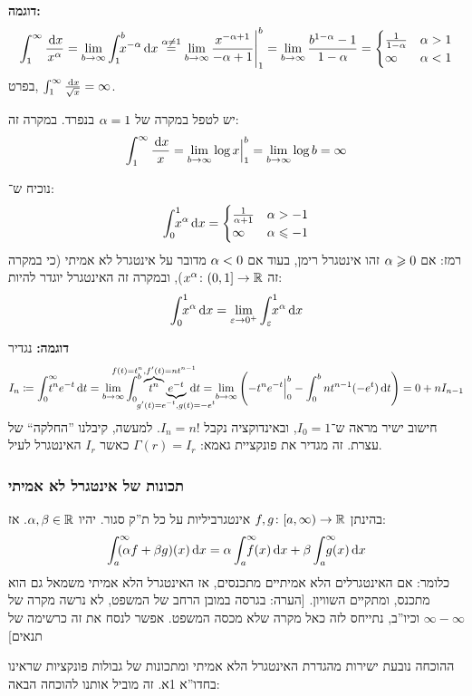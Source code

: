 \documentclass[name=רשימות חדו''א 2א]{../../../tex/classes/noChapterMegasumPreamble}
\newcommand\Is{\dequad \ }
\begin{document}
	\textbf{דוגמה: }
	\[ \int^{\infty}_1 \frac{\dx}{x^{\ag}} = \lim_{b \to \infty} \int^{b}_1 \Is x^{-\ag}\dx \overset{\ag \neq 1}{=} \lim_{b \to \infty} \frac{x^{-\ag + 1}}{-\ag + 1}\Bigg\vert^{b}_1 = \lim_{b \to \infty}\frac{b^{1 - \ag} - 1}{1 - \ag} = \begin{cases}
		\frac{1}{1 - \ag} & \ag > 1 \\
		\infty & \ag < 1
	\end{cases} \]
	בפרט, $\int^{\infty}_1 \frac{\,\mathrm{d}x}{\sqrt x} = \infty$.

	יש לטפל במקרה של $\alpha = 1$ בנפרד. במקרה זה:
	\[ \int^{\infty}_1 \frac{\,\mathrm{d}x}{x} = \lim_{b \to \infty} \log x \Big\vert^{b}_1 = \lim_{b \to \infty} \log b = \infty \]

	\exe{חשבו את האינטגרל:
	\[ \int^{1}_0 \Is x^{\ag} \]}
	נוכיח ש־:
	\[ \int^{1}_0\Is x^{\ag}\dx = \begin{cases}
		\frac{1}{\ag  +1} & \ag > -1 \\
		\infty & \ag \le -1
	\end{cases} \]
	רמז: אם $\alpha \geqslant 0$ זהו אינטגרל רימן, בעוד אם $\alpha < 0$ מדובר על אינטגרל לא אמיתי (כי במקרה זה $x^{\alpha} \colon (0, 1] \to \mathbb{R}$), ובמקרה זה האינטגרל יוגדר להיות:
	\[ \int^{1}_0 \Is x^{\ag}\dx = \lim_{\eg \to 0^{+}} \int^{1}_{\eg} \Is x^{\ag} \dx \]

	\textbf{דוגמה: }נגדיר
	\[ I_n \cod \int^{\infty}_0 \dequad t^{n}e^{-t}\dt = \lim_{b \to \infty} \int^{b}_0  \overbrace{t^{n}}^{\mathclap{f(t) = t^{n}, f'(t) = nt^{n -1}}}\underbrace{e^{-t}}_{\mathclap{g'(t) = e^{-t}, g(t) = -e^{t}}}\dt = \lim_{b \to \infty} \cl{-t^{n}e^{-t}\Big\vert^{b}_0 - \int^{b}_0 nt^{n - 1}(-e^{t})\dt} = 0 + nI_{n - 1} \]
	חישוב ישיר מראה ש־$I_0 = 1$, ובאינדוקציה נקבל $I_n = n!$. למעשה, קיבלנו ''החלקה`` של עצרת. זה מגדיר את פונקציית גאמא: $\Gamma(r) = I_r$ כאשר $I_r$ האינטגרל לעיל.

\subsubsection{תכונות של אינטגרל לא אמיתי}
	\begin{Claim}
		בהינתן $f, g \colon [a, \infty) \to \mathbb{R}$ אינטגרביליות על כל ת''ק סגור. יהיו $\alpha, \beta \in \mathbb{R}$. אז:
		\[ \int^{\infty}_a \dequad (\ag f + \bg g)(x)\dx = \ag\int^{\infty}_a \dequad f(x)\dx + \bg\int^{\infty}_a \dequad g(x)\dx \]
		כלומר: אם האינטגרלים הלא אמיתיים מתכנסים, אז האינטגרל הלא אמיתי משמאל גם הוא מתכנס, ומתקיים השוויון. [הערה: בגרסה במובן הרחב של המשפט, לא נרשה מקרה של $\infty - \infty$ וכיו''ב, נתייחס לזה כאל מקרה שלא מכסה המשפט. אפשר לנסח את זה כרשימה של תנאים]
	\end{Claim}
	ההוכחה נובעת ישירות מהגדרת האינטגרל הלא אמיתי ומתכונות של גבולות פונקציות שראינו בחדו''א 1א. זה מוביל אותנו להוכחה הבאה:
	\prooftrivial
\end{document}

